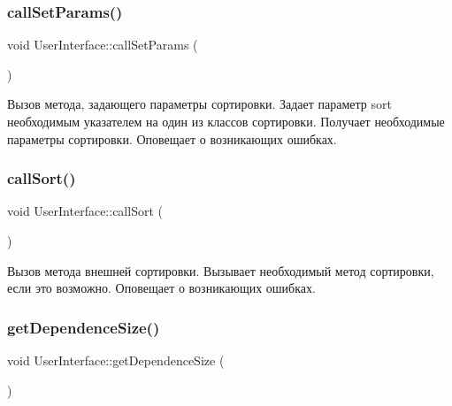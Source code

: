 \subsubsection{\texorpdfstring{call\+Set\+Params()}{callSetParams()}}
{\footnotesize\ttfamily void User\+Interface\+::call\+Set\+Params (\begin{DoxyParamCaption}{ }\end{DoxyParamCaption})\hspace{0.3cm}{\ttfamily [private]}}



Вызов метода, задающего параметры сортировки. Задает параметр sort необходимым указателем на один из классов сортировки. Получает необходимые параметры сортировки. Оповещает о возникающих ошибках. 

\hypertarget{class_user_interface_a0e03dfecee7e890ad1e076888062d5cb}{}\label{class_user_interface_a0e03dfecee7e890ad1e076888062d5cb} 
\subsubsection{\texorpdfstring{call\+Sort()}{callSort()}}
{\footnotesize\ttfamily void User\+Interface\+::call\+Sort (\begin{DoxyParamCaption}{ }\end{DoxyParamCaption})\hspace{0.3cm}{\ttfamily [private]}}



Вызов метода внешней сортировки. Вызывает необходимый метод сортировки, если это возможно. Оповещает о возникающих ошибках. 

\hypertarget{class_user_interface_af7c9d93ec693f70dcfbdd9e6a080abc7}{}\label{class_user_interface_af7c9d93ec693f70dcfbdd9e6a080abc7} 
\subsubsection{\texorpdfstring{get\+Dependence\+Size()}{getDependenceSize()}}
{\footnotesize\ttfamily void User\+Interface\+::get\+Dependence\+Size (\begin{DoxyParamCaption}{ }\end{DoxyParamCaption})\hspace{0.3cm}{\ttfamily [private]}}

